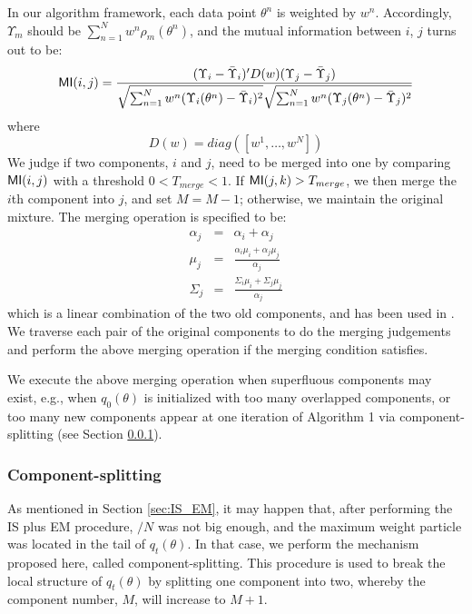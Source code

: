 In our algorithm framework, each data point $\theta^n$ is weighted
by $w^n$. Accordingly, $\Upsilon_m$ should be $\sum_{n=1}^N w^n
\rho_m(\theta^n)$, and the mutual information between $i$, $j$ turns
out to be:
\begin{equation}\label{Merge_criterion_correlation}
\MI(i,j)=\frac{(\Upsilon_i-\bar{\Upsilon}_i)'
D(w)(\Upsilon_j-\bar{\Upsilon}_j)}{\sqrt{\sum_{n=1}^N
w^n(\Upsilon_i(\theta^{n})-\bar{\Upsilon}_i)^2}\sqrt{\sum_{n=1}^N
w^n(\Upsilon_j(\theta^{n})-\bar{\Upsilon}_j)^2}}
\end{equation}
where
\begin{equation}
D(w)=diag([w^1,\ldots,w^N])
\end{equation}
We judge if two components, $i$ and $j$, need to be merged into one
by comparing $\textsf{MI}(i,j)$ with a threshold $0<T_{merge}<1$. If
$\textsf{MI}(j,k)>T_{merge}$, we then merge the $i$th component into $j$,
and set $M=M-1$; otherwise, we maintain the original mixture. The
merging operation is specified to be:
\begin{eqnarray}\label{Linear_combination_components}
\alpha_{j}&=&\alpha_{i}+\alpha_{j}\\
\mu_{j}&=&\frac{\alpha_{i}\mu_{i}+\alpha_{j}\mu_{j}}{\alpha_{j}}\\
\Sigma_{j}&=&\frac{\Sigma_{i}\mu_{i}+\Sigma_{j}\mu_{j}}{\alpha_{j}}
\end{eqnarray}
which is a linear combination of the two old components, and has
been used in \cite{wang2004estimation}. We traverse each pair of the
original components to do the merging judgements and perform the
above merging operation if the merging condition satisfies.

We execute the above merging operation when superfluous components
may exist, e.g., when $q_0(\theta)$ is initialized with too many
overlapped components, or too many new components appear at one
iteration of Algorithm 1 via component-splitting (see Section
\ref{sec:split}).

\subsubsection{Component-splitting}\label{sec:split}
As mentioned in Section \ref{sec:IS_EM}, it may happen that, after
performing the IS plus EM procedure, \ESS$/N$ was not big enough,
and the maximum weight particle was located in the tail of
$q_t(\theta)$. In that case, we perform the mechanism proposed here,
called component-splitting. This procedure is used to break the
local structure of $q_t(\theta)$ by splitting one component into
two, whereby the component number, $M$, will increase to $M+1$.

